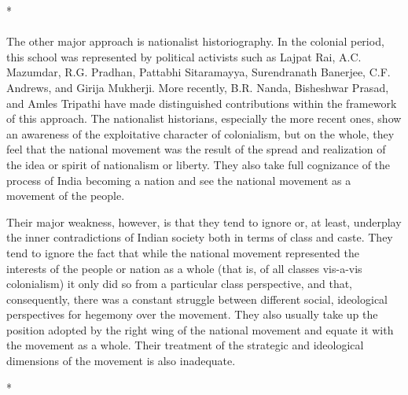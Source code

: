 \begin{multicols}{2}
\begin{center}*\end{center}

\paragraph*{}
The other major approach is nationalist historiography. In the colonial period, this school was represented by political activists such as Lajpat Rai, A.C. Mazumdar, R.G. Pradhan, Pattabhi Sitaramayya, Surendranath Banerjee, C.F. Andrews, and Girija Mukherji. More recently, B.R. Nanda, Bisheshwar Prasad, and Amles Tripathi have made distinguished contributions within the framework of this approach. The nationalist historians, especially the more recent ones, show an awareness of the exploitative character of colonialism, but on the whole, they feel that the national movement was the result of the spread and realization of the idea or spirit of nationalism or liberty. They also take full cognizance of the process of India becoming a nation and see the national movement as a movement of the people.

Their major weakness, however, is that they tend to ignore or, at least, underplay the inner contradictions of Indian society both in terms of class and caste. They tend to ignore the fact that while the national movement represented the interests of the people or nation as a whole (that is, of all classes vis-a-vis colonialism) it only did so from a particular class perspective, and that, consequently, there was a constant struggle between different social, ideological perspectives for hegemony over the movement. They also usually take up the position adopted by the right wing of the national movement and equate it with the movement as a whole. Their treatment of the strategic and ideological dimensions of the movement is also inadequate.

\begin{center}*\end{center}


\end{multicols}
